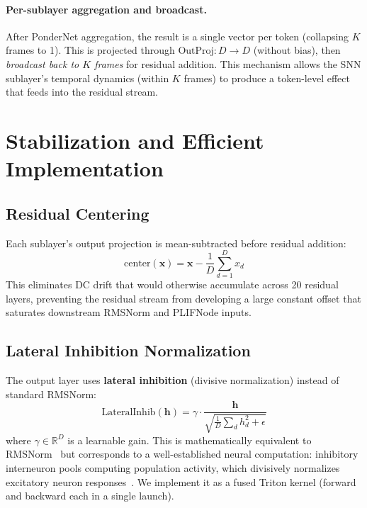\documentclass[10pt,twocolumn]{article}
\newcommand{\R}{\mathbb{R}}
\begin{document}
\paragraph{Per-sublayer aggregation and broadcast.}
After PonderNet aggregation, the result is a single vector per token (collapsing $K$ frames to 1).
This is projected through $\text{OutProj}: D \to D$ (without bias), then \emph{broadcast back to $K$ frames} for residual addition.
This mechanism allows the SNN sublayer's temporal dynamics (within $K$ frames) to produce a token-level effect that feeds into the residual stream.


\section{Stabilization and Efficient Implementation}
\label{sec:implementation}

\subsection{Residual Centering}
\label{sec:residual-centering}

Each sublayer's output projection is mean-subtracted before residual addition:
\begin{equation}
    \text{center}(\mathbf{x}) = \mathbf{x} - \frac{1}{D} \sum_{d=1}^{D} x_d
    \label{eq:centering}
\end{equation}
This eliminates DC drift that would otherwise accumulate across 20 residual layers, preventing the residual stream from developing a large constant offset that saturates downstream RMSNorm and PLIFNode inputs.

\subsection{Lateral Inhibition Normalization}
\label{sec:lateral-inhibition}

The output layer uses \textbf{lateral inhibition} (divisive normalization) instead of standard RMSNorm:
\begin{equation}
    \text{LateralInhib}(\mathbf{h}) = \gamma \cdot \frac{\mathbf{h}}{\sqrt{\frac{1}{D}\sum_d h_d^2 + \epsilon}}
    \label{eq:lateral-inhib}
\end{equation}
where $\gamma \in \R^D$ is a learnable gain.
This is mathematically equivalent to RMSNorm~\citep{zhang2019root} but corresponds to a well-established neural computation: inhibitory interneuron pools computing population activity, which divisively normalizes excitatory neuron responses~\citep{carandini2012normalization}.
We implement it as a fused Triton kernel (forward and backward each in a single launch).
\end{document}
